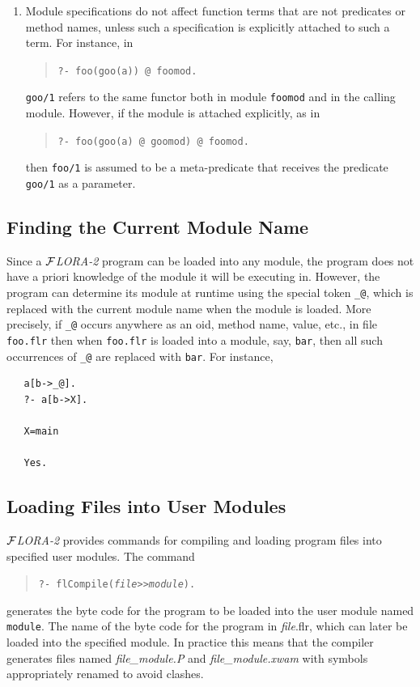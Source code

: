 \documentclass[11pt]{article}
\makeatletter
\newcommand{\thismodule}{{\tt \_@}\xspace}
\newcommand{\FLORA}{{\mbox{${\cal F}${\small\it LORA}\rm\emph{-2}}}\xspace}
\newcommand{\ofile}{xwam}
\makeatother
\begin{document}
\begin{enumerate}
\item Module specifications do not affect function terms that are not
  predicates or method names, unless such a specification is explicitly
  attached to such a term. For instance, in
  \begin{quote}
    \verb|?- foo(goo(a)) @ foomod.|
  \end{quote}
  {\tt goo/1} refers to the same functor both in module {\tt foomod} and in
  the calling module. However, if the module is attached explicitly, as in
  \begin{quote}
    \verb|?- foo(goo(a) @ goomod) @ foomod.|
  \end{quote}
  then {\tt foo/1} is assumed to be a meta-predicate that receives the
  predicate {\tt goo/1}  as a parameter.
\end{enumerate}


\subsection{Finding the Current Module Name}

\index{module!\thismodule}
\index{\thismodule}
%
Since a \FLORA program can be loaded into any module, the program does not
have a priori knowledge of the module it will be executing in. However, the
program can determine its module at runtime using the special token
\thismodule, which is replaced with the current module name when the module
is loaded. More precisely, if \thismodule occurs anywhere as an oid, method
name, value, etc., in file {\tt foo.flr} then when {\tt foo.flr} is loaded
into a module, say, {\tt bar}, then all such occurrences of \thismodule are
replaced with {\tt bar}. For instance,
\begin{verbatim}
   a[b->_@].
   ?- a[b->X].

   X=main

   Yes.
\end{verbatim}



\subsection{Loading Files into User Modules}\label{sec-loading-mods}


\FLORA provides commands for compiling and loading program files into
specified user modules.
The
command 
\begin{quote}
  {\tt ?- flCompile({\it file}>>{\it module}).}
\end{quote}
generates the byte code for the program to be loaded into the user module
named {\tt module}. The name of the byte code for the program in
\emph{file}.flr, which can later be loaded into the specified module. In
practice this means that the compiler generates files named
\emph{file\_module.P} and \emph{file\_module.\ofile} with symbols appropriately
renamed to avoid clashes.
\end{document}
